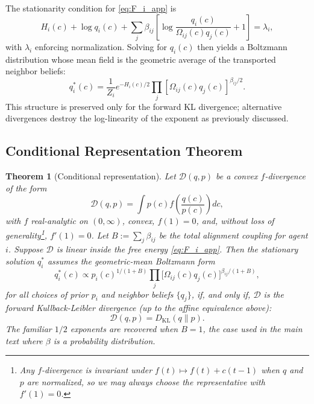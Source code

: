 \documentclass[11pt]{article}
\newtheorem{theorem}{Theorem}
\begin{document}
The stationarity condition for \eqref{eq:F_i_app} is
\begin{equation}
H_i(c)
+ \log q_i(c)
+ \sum_j \beta_{ij}
\left[
\log\frac{q_i(c)}{\Omega_{ij}(c)q_j(c)}+1
\right]
= \lambda_i,
\end{equation}
with $\lambda_i$ enforcing normalization. Solving for $q_i(c)$ then yields a Boltzmann distribution whose mean field is the geometric average of the transported neighbor beliefs:
\begin{equation}
q_i^*(c)
= \frac{1}{Z_i}
e^{-H_i(c)/2}
\prod_j
[\Omega_{ij}(c) q_j(c)]^{\beta_{ij}/2}.
\end{equation}
This structure is preserved only for the forward KL divergence; alternative divergences destroy the log-linearity of the exponent as previously discussed.

\subsection*{Conditional Representation Theorem}

\begin{theorem}[Conditional representation]\label{thm:representation_app}
Let\/ $\mathcal{D}(q,p)$ be a convex $f$-divergence of the form
\[
\mathcal{D}(q,p)
= \int p(c)f\left(\frac{q(c)}{p(c)}\right)dc,
\]
with $f$ \emph{real-analytic on $(0, \infty)$}, convex, $f(1)=0$, and, without loss of generality\footnote{Any $f$-divergence is invariant under $f(t)\mapsto f(t)+c(t-1)$ when $q$ and $p$ are normalized, so we may always choose the representative with $f'(1)=0$.}, $f'(1)=0$. Let $B := \sum_j \beta_{ij}$ be the total alignment coupling for agent $i$. Suppose $\mathcal{D}$ is linear inside the free energy \eqref{eq:F_i_app}. Then the stationary solution $q_i^*$ assumes the geometric-mean Boltzmann form
\begin{equation}
q_i^*(c) \propto p_i(c)^{1/(1+B)}\prod_{j}\bigl[\Omega_{ij}(c)q_j(c)\bigr]^{\beta_{ij}/(1+B)},
\label{eq:geometric_mean_target_app}
\end{equation}
for all choices of prior $p_i$ and neighbor beliefs $\{q_j\}$, if, and only if, $\mathcal{D}$ is the forward Kullback-Leibler divergence (up to the affine equivalence above):
\[
\mathcal{D}(q,p) = D_{\mathrm{KL}}(q\|p).
\]
The familiar $1/2$ exponents are recovered when $B = 1$, the case used in the main text where $\beta$ is a probability distribution.
\end{theorem}
\end{document}
